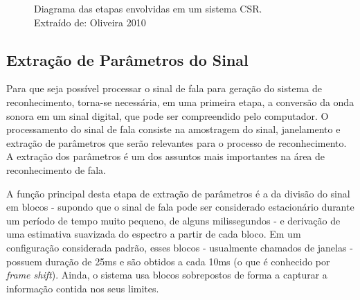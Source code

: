 \documentclass[12pt,a4paper,oneside]{report}
\begin{document}
\begin{figure}[h!]
\centering
{}\caption{Diagrama das etapas envolvidas em um sistema CSR. \\ \footnotesize * Extraído de: Oliveira 2010 \cite{fravisphinx}}
\label{fig:CSR}
\end{figure}

\subsection{Extração de Parâmetros do Sinal}

Para que seja possível processar o sinal de fala para geração do sistema de reconhecimento, torna-se necessária, em uma primeira etapa, a conversão da onda sonora em um sinal digital, que pode ser compreendido pelo computador. O processamento do sinal de fala consiste na amostragem do sinal, janelamento e extração de parâmetros que serão relevantes para o processo de reconhecimento. A extração dos parâmetros é um dos assuntos mais importantes na área de reconhecimento de fala.

A função principal desta etapa de extração de parâmetros é a da divisão do sinal em blocos - supondo que o sinal de fala pode ser considerado estacionário durante um período de tempo muito pequeno, de alguns milissegundos - e derivação de uma estimativa suavizada do espectro a partir de cada bloco. Em um configuração considerada padrão, esses blocos - usualmente chamados de janelas - possuem duração de 25ms e são obtidos a cada 10ms (o que é conhecido por \emph{frame shift}). Ainda, o sistema usa blocos sobrepostos de forma a capturar a informação contida nos seus limites.
\end{document}
